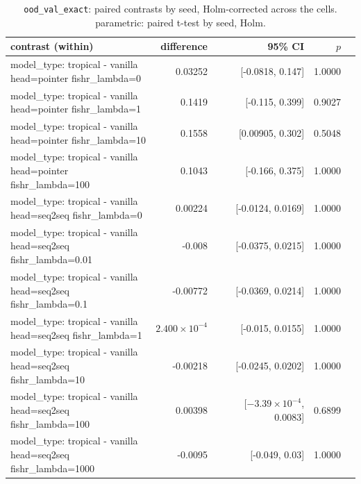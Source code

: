 \documentclass[10pt]{article}
\makeatletter
\newcommand{\stackcell}[1]{\begin{tabular}[t]{@{}l@{}}#1\end{tabular}}
\makeatother
\begin{document}
{\small
\begin{longtable}{lrrrl}
\caption{\texttt{ood\_val\_exact}: paired contrasts by seed, Holm-corrected across the cells. parametric: paired t-test by seed, Holm.}\label{tab:paired-ood_val_exact}\\
\toprule
contrast (within) & difference & 95\% CI & $p$ & \\
\midrule
\endhead
\stackcell{model\_type: tropical - vanilla\\\footnotesize head=pointer fishr\_lambda=0 } & 0.03252 & [-0.0818, 0.147] & 1.0000 & \\
\stackcell{model\_type: tropical - vanilla\\\footnotesize head=pointer fishr\_lambda=1 } & 0.1419 & [-0.115, 0.399] & 0.9027 & \\
\stackcell{model\_type: tropical - vanilla\\\footnotesize head=pointer fishr\_lambda=10 } & 0.1558 & [0.00905, 0.302] & 0.5048 & \\
\stackcell{model\_type: tropical - vanilla\\\footnotesize head=pointer fishr\_lambda=100 } & 0.1043 & [-0.166, 0.375] & 1.0000 & \\
\stackcell{model\_type: tropical - vanilla\\\footnotesize head=seq2seq fishr\_lambda=0 } & 0.00224 & [-0.0124, 0.0169] & 1.0000 & \\
\stackcell{model\_type: tropical - vanilla\\\footnotesize head=seq2seq fishr\_lambda=0.01 } & -0.008 & [-0.0375, 0.0215] & 1.0000 & \\
\stackcell{model\_type: tropical - vanilla\\\footnotesize head=seq2seq fishr\_lambda=0.1 } & -0.00772 & [-0.0369, 0.0214] & 1.0000 & \\
\stackcell{model\_type: tropical - vanilla\\\footnotesize head=seq2seq fishr\_lambda=1 } & $2.400\times10^{-4}$ & [-0.015, 0.0155] & 1.0000 & \\
\stackcell{model\_type: tropical - vanilla\\\footnotesize head=seq2seq fishr\_lambda=10 } & -0.00218 & [-0.0245, 0.0202] & 1.0000 & \\
\stackcell{model\_type: tropical - vanilla\\\footnotesize head=seq2seq fishr\_lambda=100 } & 0.00398 & [$-3.39\times10^{-4}$, 0.0083] & 0.6899 & \\
\stackcell{model\_type: tropical - vanilla\\\footnotesize head=seq2seq fishr\_lambda=1000 } & -0.0095 & [-0.049, 0.03] & 1.0000 & \\

\end{longtable}}
\end{document}
